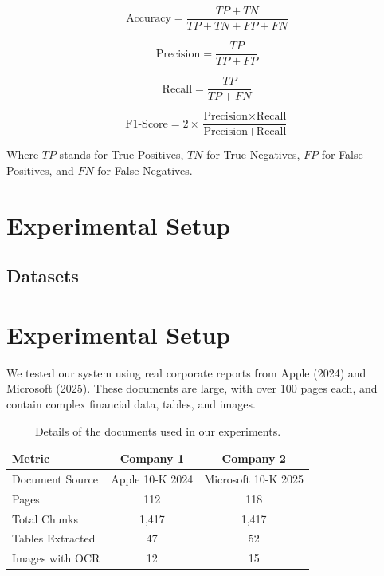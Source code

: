 \documentclass[acmsmall,screen]{acmart}
\begin{document}
\begin{equation}
\text{Accuracy} = \frac{TP + TN}{TP + TN + FP + FN}
\end{equation}

\begin{equation}
\text{Precision} = \frac{TP}{TP + FP}
\end{equation}

\begin{equation}
\text{Recall} = \frac{TP}{TP + FN}
\end{equation}

\begin{equation}
\text{F1-Score} = 2 \times \frac{\text{Precision} \times \text{Recall}}{\text{Precision} + \text{Recall}}
\end{equation}

Where $TP$ stands for True Positives, $TN$ for True Negatives, $FP$ for False Positives, and $FN$ for False Negatives.

\section{Experimental Setup}

\subsection{Datasets}

\section{Experimental Setup}
We tested our system using real corporate reports from Apple (2024) and Microsoft (2025). These documents are large, with over 100 pages each, and contain complex financial data, tables, and images.

\begin{table}[h]
\centering
\caption{Details of the documents used in our experiments.}
\label{tab:datasets}
\begin{tabular}{@{}lcc@{}}
\toprule
\textbf{Metric} & \textbf{Company 1} & \textbf{Company 2} \\
\midrule
Document Source & Apple 10-K 2024 & Microsoft 10-K 2025 \\
Pages & 112 & 118 \\
Total Chunks & 1,417 & 1,417 \\
Tables Extracted & 47 & 52 \\
Images with OCR & 12 & 15 \\
\bottomrule
\end{tabular}
\end{table}
\end{document}
